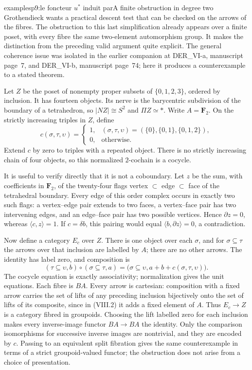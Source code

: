 \begin{dcomment}{examples}{p9:le foncteur $u^*$ induit par}{A finite obstruction in degree two}
Grothendieck wants a practical descent test that can be checked on the arrows of the fibres. The obstruction to this last simplification already appears over a finite poset, with every fibre the same two-element automorphism group. It makes the distinction from the preceding valid argument quite explicit. The general coherence issue was isolated in the earlier companion at DER\_VI-a, manuscript page~7, and DER\_VI-b, manuscript page~74; here it produces a counterexample to a stated theorem.

Let $Z$ be the poset of nonempty proper subsets of $\{0,1,2,3\}$, ordered by inclusion. It has fourteen objects. Its nerve is the barycentric subdivision of the boundary of a tetrahedron, so $|NZ|\cong S^2$ and $\Pi Z\simeq*$. Write $A=\mathbf F_2$. On the strictly increasing triples in $Z$, define
\[
 c(\sigma,\tau,\upsilon)=
 \begin{cases}
 1,&(\sigma,\tau,\upsilon)=(\{0\},\{0,1\},\{0,1,2\}),\\
 0,&\text{otherwise}.
 \end{cases}
\]
Extend $c$ by zero to triples with a repeated object. There is no strictly increasing chain of four objects, so this normalized $2$-cochain is a cocycle.

It is useful to verify directly that it is not a coboundary. Let $z$ be the sum, with coefficients in $\mathbf F_2$, of the twenty-four flags vertex $\subset$ edge $\subset$ face of the tetrahedral boundary. Every edge of this order complex occurs in exactly two such flags: a vertex--edge pair extends to two faces, a vertex--face pair has two intervening edges, and an edge--face pair has two possible vertices. Hence $\partial z=0$, whereas $\langle c,z\rangle=1$. If $c=\delta b$, this pairing would equal $\langle b,\partial z\rangle=0$, a contradiction.

Now define a category $E_c$ over $Z$. There is one object over each $\sigma$, and for $\sigma\subseteq\tau$ the arrows over that inclusion are labelled by $A$; there are no other arrows. The identity has label zero, and composition is
\[
 (\tau\subseteq\upsilon,b)\circ(\sigma\subseteq\tau,a)
 =\bigl(\sigma\subseteq\upsilon,
        a+b+c(\sigma,\tau,\upsilon)\bigr).
 \tag{VIII.2}
\]
The cocycle equation is exactly associativity; normalization gives the unit equations. Each fibre is $BA$. Every arrow is cartesian: composition with a fixed arrow carries the set of lifts of any preceding inclusion bijectively onto the set of lifts of its composite, since in (VIII.2) it adds a fixed element of $A$. Thus $E_c\to Z$ is a category fibred in groupoids. Choosing the lift labelled zero for each inclusion makes every inverse-image functor $BA\to BA$ the identity. Only the comparison isomorphisms for successive inverse images are nontrivial, and they are encoded by $c$. Passing to an equivalent split fibration gives the same counterexample in terms of a strict groupoid-valued functor; the obstruction does not arise from a choice of presentation.


\end{dcomment}
